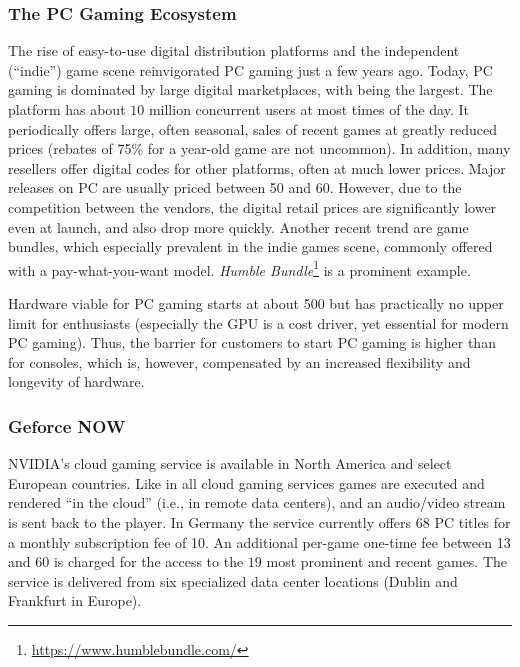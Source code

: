 \subsubsection{The PC Gaming Ecosystem}
\label{sec:pcgaming}

The rise of easy-to-use digital distribution platforms and the independent (``indie'') game scene reinvigorated PC gaming just a few years ago. Today, PC gaming is dominated by large digital marketplaces, with \steam being the largest. The platform has about $10$ million concurrent users at most times of the day. It periodically offers large, often seasonal, sales of recent games at greatly reduced prices (rebates of 75\% for a year-old game are not uncommon). In addition, many resellers offer digital codes for other platforms, often at much lower prices.
Major releases on PC are usually priced between \SI{50}[\EUR]{} and \SI{60}[\EUR]{}. However, due to the competition between the vendors, the digital retail prices are significantly lower even at launch, and also drop more quickly. Another recent trend are game bundles, which especially prevalent in the indie games scene, commonly offered with a pay-what-you-want model. \textit{Humble Bundle}\footnote{\url{https://www.humblebundle.com/}} is a prominent example. 

Hardware viable for PC gaming starts at about \SI{500}[\EUR]{} but has practically no upper limit for enthusiasts (especially the \gls{GPU} is a cost driver, yet essential for modern PC gaming). Thus, the barrier for customers to start PC gaming is higher than for consoles, which is, however, compensated by an increased flexibility and longevity of hardware.


\subsubsection{Geforce NOW}

NVIDIA's cloud gaming service %
is available in North America and select European countries. Like in all cloud gaming services  games are executed and rendered ``in the cloud'' (i.e., in remote data centers), and an audio/video stream is sent back to the player. In Germany the service currently offers $68$ PC titles for a monthly subscription fee of \SI{10}[\EUR]{}. An additional per-game one-time fee between \SI{13}[\EUR]{} and \SI{60}[\EUR]{} is charged for the access to the $19$ most prominent and recent games. The service is delivered from six specialized data center locations (Dublin and Frankfurt in Europe).

